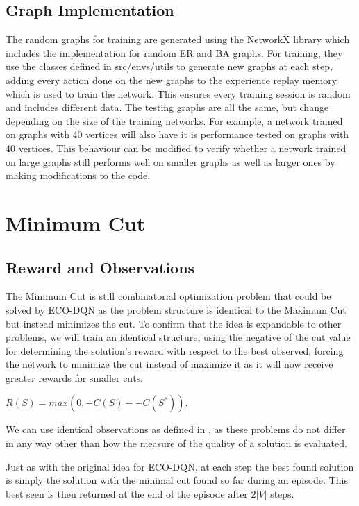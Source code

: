 \documentclass{article}
\begin{document}
\subsection{Graph Implementation}\label{sec:graph-implementation}

The random graphs for training are generated using the NetworkX library which includes the implementation for random ER and BA graphs. For training, they use the classes defined in src/envs/utils to generate new graphs at each step, adding every action done on the new graphs to the experience replay memory which is used to train the network. This ensures every training session is random and includes different data. The testing graphs are all the same, but change depending on the size of the training networks. For example, a network trained on graphs with 40 vertices will also have it is performance tested on graphs with 40 vertices. This behaviour can be modified to verify whether a network trained on large graphs still performs well on smaller graphs as well as larger ones by making modifications to the code.

\section{Minimum Cut}\label{sec:min-cut}

\subsection{Reward and Observations}\label{sec:reward-shaping-min-cut}

The Minimum Cut is still combinatorial optimization problem that could be solved by ECO-DQN as the problem structure is identical to the Maximum Cut but instead minimizes the cut. To confirm that the idea is expandable to other problems, we will train an identical structure, using the negative of the cut value for determining the solution's reward with respect to the best observed, forcing the network to minimize the cut instead of maximize it as it will now receive greater rewards for smaller cuts. 

$R(S) = max(0, -C(S) - -C(S^*))$. 

We can use identical observations as defined in , as these problems do not differ in any way other than how the measure of the quality of a solution is evaluated.

Just as with the original idea for ECO-DQN, at each step the best found solution is simply the solution with the minimal cut found so far during an episode. This best seen is then returned at the end of the episode after $2|V|$ steps.
\end{document}
